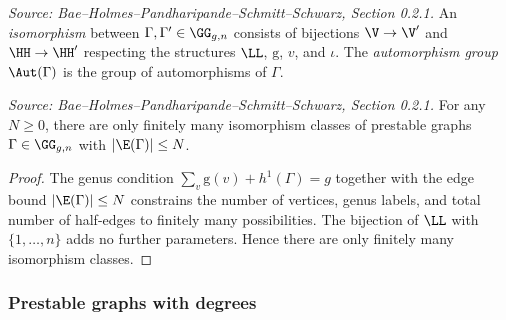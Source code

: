 \begin{definition}
  \label{def:prestable_graph_isom}
  \textit{Source: Bae--Holmes--Pandharipande--Schmitt--Schwarz, Section 0.2.1.}
  An \emph{isomorphism} between $\Gamma, \Gamma' \in \GG_{g,n}$ consists of bijections
  $\V \to \V'$ and $\HH \to \HH'$ respecting the structures $\LL$, $\mathrm{g}$, $v$,
  and $\iota$. The \emph{automorphism group} $\Aut(\Gamma)$ is the group of automorphisms
  of $\Gamma$.
\end{definition}

\begin{lemma}
  \label{lem:prestable_graph_finite_isom_classes}
  \textit{Source: Bae--Holmes--Pandharipande--Schmitt--Schwarz, Section 0.2.1.}
  For any $N \geq 0$, there are only finitely many isomorphism classes of prestable graphs
  $\Gamma \in \GG_{g,n}$ with $|\E(\Gamma)| \leq N$.
\end{lemma}

\begin{proof}
  The genus condition $\sum_{v} \mathrm{g}(v) + h^1(\Gamma) = g$ together with the
  edge bound $|\E(\Gamma)| \leq N$ constrains the number of vertices, genus labels, and
  total number of half-edges to finitely many possibilities.  The bijection of $\LL$ with
  $\{1,\ldots,n\}$ adds no further parameters.  Hence there are only finitely many
  isomorphism classes.
\end{proof}

\subsubsection{Prestable graphs with degrees}

